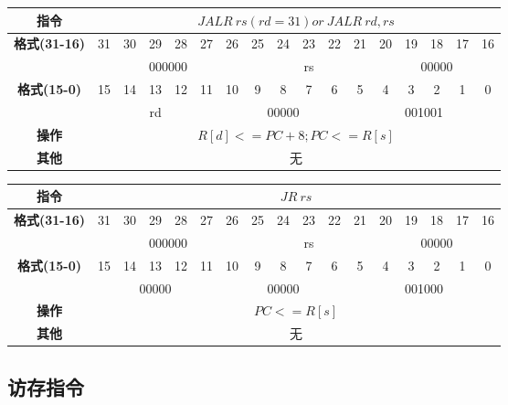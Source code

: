 \documentclass[11pt,utf8]{article}
\begin{document}
\begin{center}
\begin{tabular}{|c|c|c|c|c|c|c|c|c|c|c|c|c|c|c|c|c|}
\hline
\textbf{指令} & \multicolumn{16}{c|}{$JALR~rs(rd=31)or~JALR~rd,rs$} \\
\hline
\multirow{2}{*}{\textbf{格式(31-16)}} & 31 & 30 & 29 & 28 & 27 & 26 & 25 & 24 & 23 & 22 & 21 & 20 & 19 & 18 & 17 & 16 \\ 
\cline{2-17}
& \multicolumn{6}{c|}{000000} & \multicolumn{5}{c|}{rs} & \multicolumn{5}{c|}{00000}\\
\hline
\multirow{2}{*}{\textbf{格式(15-0)}} & 15 & 14 & 13 & 12 & 11 & 10 & 9 & 8 & 7 & 6 & 5 & 4 & 3 & 2 & 1 & 0 \\
\cline{2-17}
& \multicolumn{5}{c|}{rd}& \multicolumn{5}{c|}{00000}& \multicolumn{6}{c|}{001001}\\
\hline
\textbf{操作} & \multicolumn{16}{c|}{$R[d]<=PC+8;PC<=R[s]$} \\
\hline
\textbf{其他} & \multicolumn{16}{c|}{无} \\
\hline
\end{tabular}
\end{center}


\begin{center}
\begin{tabular}{|c|c|c|c|c|c|c|c|c|c|c|c|c|c|c|c|c|}
\hline
\textbf{指令} & \multicolumn{16}{c|}{$JR~rs$} \\
\hline
\multirow{2}{*}{\textbf{格式(31-16)}} & 31 & 30 & 29 & 28 & 27 & 26 & 25 & 24 & 23 & 22 & 21 & 20 & 19 & 18 & 17 & 16 \\ 
\cline{2-17}
& \multicolumn{6}{c|}{000000} & \multicolumn{5}{c|}{rs} & \multicolumn{5}{c|}{00000}\\
\hline
\multirow{2}{*}{\textbf{格式(15-0)}} & 15 & 14 & 13 & 12 & 11 & 10 & 9 & 8 & 7 & 6 & 5 & 4 & 3 & 2 & 1 & 0 \\
\cline{2-17}
& \multicolumn{5}{c|}{00000}& \multicolumn{5}{c|}{00000}& \multicolumn{6}{c|}{001000}\\
\hline
\textbf{操作} & \multicolumn{16}{c|}{$PC<=R[s]$} \\
\hline
\textbf{其他} & \multicolumn{16}{c|}{无} \\
\hline
\end{tabular}
\end{center}

\subsection{访存指令}
\end{document}
